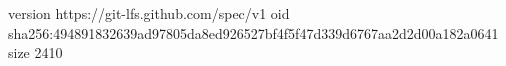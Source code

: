 version https://git-lfs.github.com/spec/v1
oid sha256:494891832639ad97805da8ed926527bf4f5f47d339d6767aa2d2d00a182a0641
size 2410
